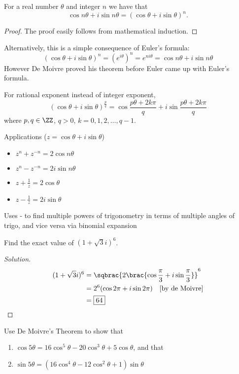 \begin{theorem}
For a real number $\theta$ and integer $n$ we have that
\[ \cos n\theta+i\sin n\theta=(\cos\theta+i\sin\theta)^n. \]
\end{theorem}

\begin{proof}
The proof easily follows from mathematical induction.
\end{proof}

Alternatively, this is a simple consequence of Euler's formula:
\[ (\cos\theta + i\sin\theta)^n = (e^{i\theta})^n = e^{ni\theta} = \cos n\theta + i\sin n\theta \]
However De Moivre proved his theorem before Euler came up with Euler's formula.

For rational exponent instead of integer exponent,
\[ (\cos\theta+i\sin\theta)^\frac{p}{q}=\cos\frac{p\theta+2k\pi}{q}+i\sin\frac{p\theta+2k\pi}{q} \]
where $p,q\in\ZZ$, $q>0$, $k=0,1,2,\dots,q-1$.

Applications ($z=\cos\theta+i\sin\theta$)
\begin{itemize}
\item $z^n+z^{-n}=2\cos n\theta$
\item $z^n-z^{-n}=2i\sin n\theta$
\item $z+\frac{1}{z}=2\cos\theta$
\item $z-\frac{1}{z}=2i\sin\theta$
\end{itemize}
Uses - to find multiple powers of trigonometry in terms of multiple angles of trigo, and vice versa via binomial expansion

\begin{exercise}{}{}
Find the exact value of $(1+\sqrt{3}i)^6$.
\end{exercise}

\begin{proof}[Solution]
	\begin{align*}
		(1+\sqrt{3}i)^6 &= \sqbrac{2\brac{\cos\frac{\pi}{3}+i\sin\frac{\pi}{3}}}^6 \\
		&= 2^6 (\cos2\pi+i\sin2\pi) \quad \text{[by de Moivre]} \\
		&= \boxed{64}
	\end{align*}
\end{proof}

\begin{exercise}{}{}
Use De Moivre's Theorem to show that
\begin{enumerate}[label=(\alph*)]
\item $\cos5\theta=16\cos^5\theta-20\cos^3\theta+5\cos\theta$, and that
\item $\sin5\theta=(16\cos^4\theta-12\cos^2\theta+1)\sin\theta$
\end{enumerate}
\end{exercise}

